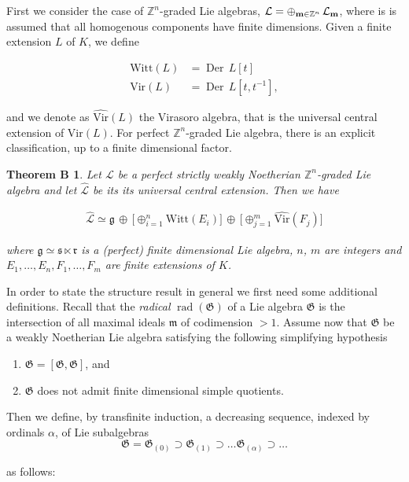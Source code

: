 \documentclass[11pt, letterpaper, reqno]{amsart}
\newtheorem*{mainB}{Theorem B}
\theoremstyle{definition}
\newcommand{\Der}{\operatorname{Der}}
\newcommand{\rad}{\operatorname{rad}}
\newcommand{\Z}{{\mathbb Z}}
\newcommand{\cL}{\mathcal L}
\newcommand{\fg}{\mathfrak{g}}
\newcommand{\fm}{\mathfrak{m}}
\newcommand{\fr}{\mathfrak{r}}
\newcommand{\fs}{\mathfrak{s}}
\newcommand{\fG}{\mathfrak{G}}
\newcommand{\Vir}{\mathrm{Vir}}
\newcommand{\Witt}{\mathrm{Witt}}
\begin{document}
First we consider the case of $\Z^n$-graded Lie algebras,
$\cL=\oplus_{{\bf m}\in\Z^n}\,\cL_{\bf m}$, where is is assumed that all homogenous components have finite dimensions.  Given a finite extension $L$ of $K$, we define


\begin{align*}
\Witt(L)&=\Der\,L[t]\\
\Vir(L)&=\Der\,L[t,t^{-1}],
\end{align*}

\noindent and we denote as  $\widehat{\Vir}(L)$  the Virasoro algebra, that is the universal central extension of $\Vir(L)$. For 
perfect $\Z^n$-graded Lie algebra, there is an explicit classification, up to a finite dimensional factor.




\begin{mainB}
Let $\cL$ be a perfect strictly 
weakly Noetherian
$\Z^n$-graded Lie algebra
and let $\hat{\cL}$ be its its universal central extension. Then we have

\begin{align*}
\widehat{\cL}\simeq \fg\,\oplus 
\,\big[\oplus_{i=1}^n\Witt(E_i)\big]\,\oplus 
\,\big[\oplus_{j=1}^m\widehat{\Vir}(F_j)\big]
\end{align*}

\noindent where $\fg\simeq \fs\ltimes\fr$ is a  (perfect) finite dimensional Lie algebra,
$n$, $m$ are integers and 
$E_1,\ldots,E_n,F_1,\ldots, F_m$ are finite extensions of $K$.
\end{mainB}


In order to state the  structure result in 
general we first need some additional definitions.
Recall that the {\it radical} $\rad(\fG)$ of a Lie algebra
$\fG$ is the intersection of all maximal ideals $\fm$ of codimension $>1$. Assume now that
$\fG$ be a weakly Noetherian Lie algebra satisfying 
the following simplifying hypothesis

\begin{enumerate}
\item[(h1)] $\fG=[\fG,\fG]$, and 
\item[(h2)] $\fG$ does not admit finite dimensional simple quotients.
\end{enumerate}

\noindent Then we define, by transfinite induction, a decreasing sequence,
indexed by ordinals $\alpha$,  
of Lie subalgebras 
$$\fG=\fG_{(0)}\supset \fG_{(1)}\supset \ldots\fG_{(\alpha)}\supset\ldots$$ 

\noindent as follows:
\end{document}
